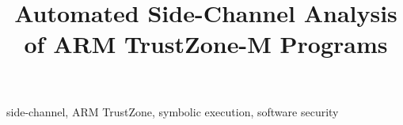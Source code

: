 \documentclass[compsoc, conference, a4paper, 10pt, times]{IEEEtran}
\begin{document}
\title{Automated Side-Channel Analysis of ARM TrustZone-M Programs}


\iffalse
\author{\IEEEauthorblockN{1\textsuperscript{st} Given Names Surname}
\IEEEauthorblockA{\textit{Affiliation} \\
City, Country \\
email address or website URL}
\and
\IEEEauthorblockN{2\textsuperscript{nd} Given Names Surname}
\IEEEauthorblockA{\textit{Affiliation} \\
City, Country \\
email address or website URL}
\and
\IEEEauthorblockN{3\textsuperscript{rd} Given Names Surname}
\IEEEauthorblockA{\textit{Affiliation} \\
City, Country \\
email address or website URL}
}
\fi

\maketitle

\begin{abstract}
  
\end{abstract}

\begin{IEEEkeywords}
side-channel, ARM TrustZone, symbolic execution, software security
\end{IEEEkeywords}












\end{document}
